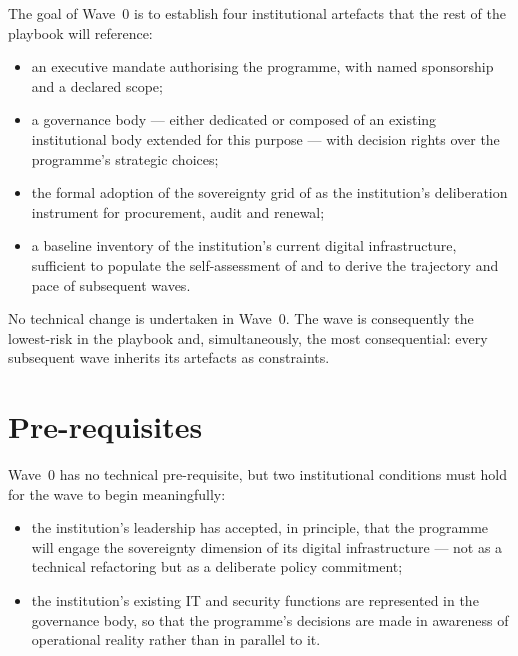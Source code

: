 The goal of Wave~0 is to establish four institutional artefacts that
the rest of the playbook will reference:

\begin{itemize}[leftmargin=1.5em,nosep]
  \item an executive mandate authorising the programme, with named
    sponsorship and a declared scope;
  \item a governance body --- either dedicated or composed of an
    existing institutional body extended for this purpose --- with
    decision rights over the programme's strategic choices;
  \item the formal adoption of the sovereignty grid of
     as the institution's
    deliberation instrument for procurement, audit and renewal;
  \item a baseline inventory of the institution's current digital
    infrastructure, sufficient to populate the self-assessment of
     and to derive the trajectory and
    pace of subsequent waves.
\end{itemize}

\noindent No technical change is undertaken in Wave~0. The wave is
consequently the lowest-risk in the playbook and, simultaneously,
the most consequential: every subsequent wave inherits its
artefacts as constraints.

\section{Pre-requisites}
\label{sec:w0-prereq}

Wave~0 has no technical pre-requisite, but two institutional
conditions must hold for the wave to begin meaningfully:

\begin{itemize}[leftmargin=1.5em,nosep]
  \item the institution's leadership has accepted, in principle, that
    the programme will engage the sovereignty dimension of its
    digital infrastructure --- not as a technical refactoring but as
    a deliberate policy commitment;
  \item the institution's existing IT and security functions are
    represented in the governance body, so that the programme's
    decisions are made in awareness of operational reality rather
    than in parallel to it.
\end{itemize}

